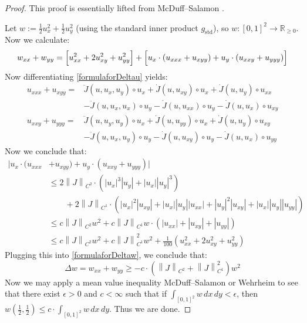 \documentclass[12pt]{article}
\theoremstyle{definition}
\theoremstyle{remark}
\numberwithin{equation}{subsection}
\newcommand{\RR}{\mathbb R}
\newcommand{\std}{\mathrm{std}}
\begin{document}
\begin{proof}
This proof is essentially lifted from McDuff--Salamon \cite[p80, Lemma 4.3.1]{mcduffsalamonJholsymp}.

Let $w:=\frac 12u_x^2+\frac 12u_y^2$ (using the standard inner product $g_\std$), so $w:[0,1]^2\to\RR_{\geq 0}$.  Now we calculate:
\begin{equation}\label{formulaforDeltaw}
w_{xx}+w_{yy}=\Bigl[u_{xx}^2+2u_{xy}^2+u_{yy}^2\Bigr]+\Bigl[u_x\cdot(u_{xxx}+u_{xyy})+u_y\cdot(u_{xxy}+u_{yyy})\Bigr]
\end{equation}
Now differentiating \eqref{formulaforDeltau} yields:
\begin{align*}
u_{xxx}+u_{xyy}=&\ddot J(u,u_x,u_y)\circ u_x+\dot J(u,u_{xy})\circ u_x+\dot J(u,u_y)\circ u_{xx}\\
&-\ddot J(u,u_x,u_x)\circ u_y-\dot J(u,u_{xx})\circ u_y-\dot J(u,u_x)\circ u_{xy}\\
u_{xxy}+u_{yyy}=&\ddot J(u,u_y,u_y)\circ u_x+\dot J(u,u_{yy})\circ u_x+\dot J(u,u_y)\circ u_{xy}\\
&-\ddot J(u,u_x,u_y)\circ u_y-\dot J(u,u_{xy})\circ u_y-\dot J(u,u_x)\circ u_{yy}
\end{align*}
Now we conclude that:
\begin{align*}
\bigl|u_x\cdot(u_{xxx}&+u_{xyy})+u_y\cdot(u_{xxy}+u_{yyy})\bigr|\\
&\leq 2\left\|J\right\|_{C^2}\cdot(\left|u_x\right|^3\left|u_y\right|+\left|u_x\right|\left|u_y\right|^3)\\
&\qquad+2\left\|J\right\|_{C^1}\cdot(\left|u_x\right|^2\left|u_{xy}\right|+\left|u_x\right|\left|u_y\right|\left|u_{xx}\right|+\left|u_y\right|^2\left|u_{xy}\right|+\left|u_x\right|\left|u_y\right|\left|u_{yy}\right|)\\
&\leq c\left\|J\right\|_{C^2}w^2+c\left\|J\right\|_{C^1}w\cdot(\left|u_{xx}\right|+\left|u_{xy}\right|+\left|u_{yy}\right|)\\
&\leq c\left\|J\right\|_{C^2}w^2+c\left\|J\right\|_{C^1}^2w^2+\frac 1{100}(u_{xx}^2+2u_{xy}^2+u_{yy}^2)
\end{align*}
Plugging this into \eqref{formulaforDeltaw}, we conclude that:
\begin{equation}
\Delta w=w_{xx}+w_{yy}\geq -c\cdot (\left\|J\right\|_{C^2}+\left\|J\right\|_{C^1}^2)w^2
\end{equation}
Now we may apply a mean value inequality McDuff--Salamon \cite[p81, Lemma 4.3.2]{mcduffsalamonJholsymp} or Wehrheim \cite[p306, Theorem 1.1]{wehrheimmeanvalue} to see that there exist $\epsilon>0$ and $c<\infty$ such that if $\int_{[0,1]^2}w\,dx\,dy<\epsilon$, then $w(\frac 12,\frac 12)\leq c\cdot\int_{[0,1]^2}w\,dx\,dy$.  Thus we are done.
\end{proof}
\end{document}
